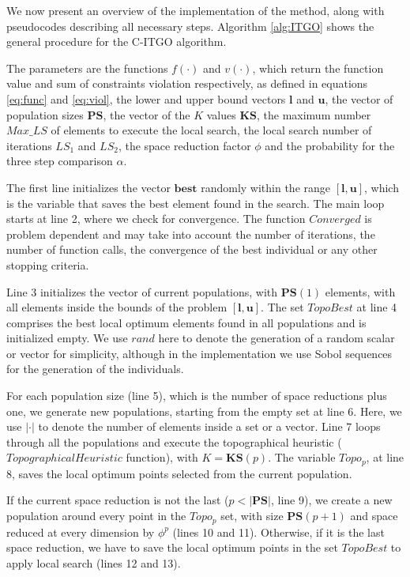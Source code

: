 We now present an overview of the implementation of the method, along with pseudocodes describing all necessary steps. Algorithm \ref{alg:ITGO} shows the general procedure for the C-ITGO algorithm.

The parameters are the functions $f(\cdot)$ and $v(\cdot)$, which return the function value and sum of constraints violation respectively, as defined in equations \ref{eq:func} and \ref{eq:viol}, the lower and upper bound vectors $\bm{l}$ and $\bm{u}$, the vector of population sizes $\bm{PS}$, the vector of the $K$ values $\bm{KS}$, the maximum number $Max\_LS$ of elements to execute the local search, the local search number of iterations $LS_1$ and $LS_2$, the space reduction factor $\phi$ and the probability for the three step comparison $\alpha$.






The first line initializes the vector $\bm{best}$ randomly within the range $[\bm{l}, \bm{u}]$, which is the variable that saves the best element found in the search. The main loop starts at line 2, where we check for convergence. The function $Converged$ is problem dependent and may take into account the number of iterations, the number of function calls, the convergence of the best individual or any other stopping criteria.

Line 3 initializes the vector of current populations, with $\bm{PS}(1)$ elements, with all elements inside the bounds of the problem $[\bm{l}, \bm{u}]$. The set $TopoBest$ at line 4 comprises the best local optimum elements found in all populations and is initialized empty. We use $rand$ here to denote the generation of a random scalar or vector for simplicity, although in the implementation we use Sobol sequences for the generation of the individuals.

For each population size (line 5), which is the number of space reductions plus one, we generate new populations, starting from the empty set at line 6. Here, we use $|\cdot|$ to denote the number of elements inside a set or a vector. Line 7 loops through all the populations and execute the topographical heuristic ($TopographicalHeuristic$ function), with $K = \bm{KS}(p)$. The variable $Topo_p$, at line 8, saves the local optimum points selected from the current population.

If the current space reduction is not the last ($p < |\bm{PS}|$, line 9), we create a new population around every point in the $Topo_p$ set, with size $\bm{PS}(p + 1)$ and space reduced at every dimension by $\phi^p$ (lines 10 and 11). Otherwise, if it is the last space reduction, we have to save the local optimum points in the set $TopoBest$ to apply local search (lines 12 and 13).\\[-1em]


